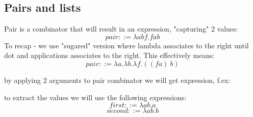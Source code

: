 \subsection{Pairs and lists}
Pair is a combinator that will result in an expression, "capturing" 2 values:
\[pair ::= \lambda{abf}.fab \]
To recap - we use "sugared" version where lambda associates to the right until dot and applications associates to the right. 
This effectively means:
\[pair ::= \lambda{a}.\lambda{b}.\lambda{f}.((f a)\ b) \]

by applying 2 arguments to pair combinator we will get expression, f.ex:

to extract the values we will use the following expressions:
\[first ::= \lambda{ab}.a \] 
\[second ::= \lambda{ab}.b \] 

